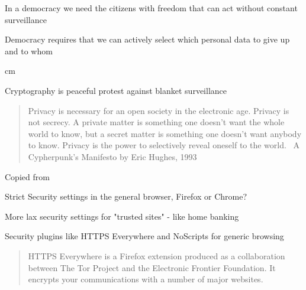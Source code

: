 \documentclass[20pt,landscape,a4paper,footrule]{foils}
\begin{document}

{\large
In a democracy we need the citizens with freedom that can act without constant surveillance

Democracy requires that we can actively select which personal data to give up and to whom
}


 cm
\centerline{\large Cryptography is peaceful protest against blanket surveillance}




\begin{quote}
	Privacy is necessary for an open society in the electronic age. Privacy is not secrecy. A private matter is something one doesn't want the whole world to know, but a secret matter is something one doesn't want anybody to know. Privacy is the power to selectively reveal oneself to the world. ~A Cypherpunk's Manifesto by Eric Hughes, 1993
\end{quote}

Copied from 





\begin{list2}
\item Strict Security settings in the general browser, Firefox or Chrome?
\item More lax security settings for "trusted sites" - like home banking
\item Security plugins like HTTPS Everywhere and NoScripts for generic browsing
\end{list2}


\begin{quote}
HTTPS Everywhere is a Firefox extension produced as a collaboration between The Tor Project and the Electronic Frontier Foundation. It encrypts your communications with a number of major websites.
\end{quote}

\centerline{}



\end{document}
